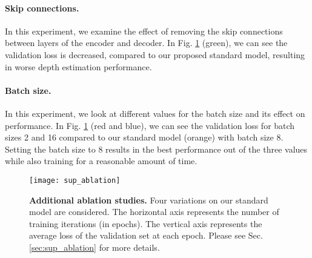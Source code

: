 \documentclass[10pt,twocolumn,letterpaper]{article}
\begin{document}
\paragraph{Skip connections.} In this experiment, we examine the effect of removing the skip connections between layers of the encoder and decoder. In Fig. \ref{fig:sup_ablation} (green), we can see the validation loss is decreased, compared to our proposed standard model, resulting in worse depth estimation performance.


\paragraph{Batch size.} In this experiment, we look at different values for the batch size and its effect on performance. In Fig. \ref{fig:sup_ablation} (red and blue), we can see the validation loss for batch sizes 2 and 16 compared to our standard model (orange) with batch size 8. Setting the batch size to 8 results in the best performance out of the three values while also training for a reasonable amount of time.



\begin{figure}[t!]
\begin{center}
\texttt{[image: sup\_ablation]}
\end{center}
   \caption{\textbf{Additional ablation studies.} Four variations on our standard model are considered. The horizontal axis represents the number of training iterations (in epochs). The vertical axis represents the average loss of the validation set at each epoch. Please see Sec. \ref{sec:sup_ablation} for more details. }
\label{fig:sup_ablation}
\end{figure}
\end{document}
